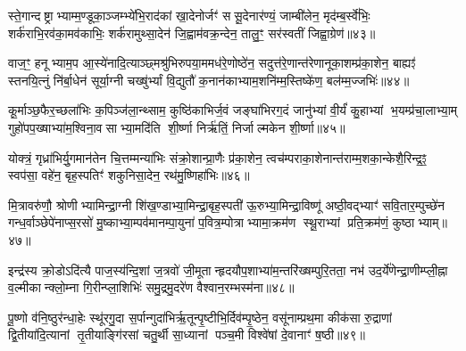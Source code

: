 स्ते॒गान्दष्ट्राभ्याम्म॒ण्डूका॒ञ्जम्भ्ये॑भि॒राद॑कां खा॒देनोर्जꣳ॑ ससू॒देनार॑ण्यं॒ जाम्बी॑लेन॒ मृद॑म्ब॒र्स्वे॑भिः॒ शर्क॑राभि॒रव॑का॒मव॑काभिः॒ शर्क॑रामुथ्सा॒देन॑ जि॒ह्वाम॑वक्र॒न्देन॒ तालु॒ꣳ॒ सर॑स्वतीं जिह्वा॒ग्रेण॑॥४३॥

{\anuvakamend[{स्ते॒गान्द्वाविꣳ॑शतिः॥11॥}]}

वाज॒ꣳ॒ हनूभ्याम॒प आ॒स्ये॑नादि॒त्याञ्छ्मश्रु॑भिरुपया॒ममध॑रे॒णोष्ठे॑न॒ सदुत्त॑रे॒णान्त॑रेणानूका॒शम्प्र॑का॒शेन॒ बाह्यꣵ॑ स्तनयि॒त्नुं नि॑र्बा॒धेन॑ सूर्या॒ग्नी चख्षु॑र्भ्यां वि॒द्युतौ॑ क॒नान॑काभ्याम॒शनि॑म्म॒स्तिष्के॑ण॒ बल॑म्म॒ज्जभिः॑॥४४॥

{\anuvakamend[{वाज॒म्पञ्च॑विशतिः॥12॥}]}

कू॒र्माञ्छ॒फैर॒च्छला॑भिः क॒पिञ्ज॑ला॒न्थ्साम॒ कुष्ठि॑काभिर्ज॒वं जङ्घा॑भिरग॒दं जानु॑भ्यां वी॒र्यं॑ कु॒हाभ्यां भ॒यम्प्र॑चा॒लाभ्या॒म् गुहो॑पप॒ख्षाभ्या॑म॒श्विना॒वसाभ्या॒मदि॑ति शी॒र्ष्णा निर्\mbox{}ऋ॑तिं॒ निर्जाल्मकेन शी॒र्ष्णा॥४५॥

{\anuvakamend[{कू॒र्मान्त्रयो॑विशतिः॥13॥}]}

योक्त्रं॒ गृध्रा॑भिर्यु॒गमान॑तेन चि॒त्तम्मन्या॑भिः संक्रो॒शान्प्रा॒णैः प्र॑का॒शेन॒ त्वच॑म्पराका॒शेनान्त॑राम्म॒शका॒न्केशै॒रिन्द्र॒ꣵ॒ स्वप॑सा॒ वहे॑न॒ बृह॒स्पतिꣳ॑ शकुनिसा॒देन॒ रथ॑मु॒ष्णिहा॑भिः॥४६॥

{\anuvakamend[{योक्त्र॒मेक॑विशतिः॥14॥}]}

मि॒त्रावरु॑णौ॒ श्रोणीभ्यामिन्द्रा॒ग्नी शि॑ख॒ण्डाभ्या॒मिन्द्रा॒बृह॒स्पती॑ ऊ॒रुभ्या॒मिन्द्रा॒विष्णू॑ अष्ठी॒वद्भ्याꣳ॑ सवि॒तार॒म्पुच्छे॑न गन्ध॒र्वाञ्छेपे॑नाप्स॒रसो॑ मु॒ष्काभ्या॒म्पव॑मानम्पा॒युना॑ प॒वित्र॒म्पोत्राभ्यामा॒क्रम॑ण स्थू॒राभ्यां प्रति॒क्रम॑णं॒ कुष्ठाभ्याम्॥४७॥

{\anuvakamend[{॥15॥}]}

इन्द्र॑स्य क्रो॒डोऽदि॑त्यै पाज॒स्य॑न्दि॒शां ज॒त्रवो॑ जी॒मूतान्हृदयौप॒शाभ्या॑म॒न्तरि॑ख्षम्पुरि॒तता॒ नभ॑ उद॒र्ये॑णेन्द्रा॒णीम्प्ली॒ह्ना व॒ल्मीकान्क्लो॒म्ना गि॒रीन्प्ला॒शिभिः॑ समु॒द्रमु॒दरे॑ण वैश्वान॒रम्भस्म॑ना॥४८॥

{\anuvakamend[{मि॒त्रावरु॑णा॒विन्द्र॑स्य॒ द्वाविꣳ॑शति॒र्द्वाविꣳ॑शतिः॥16॥}]}

पू॒ष्णो व॑नि॒ष्ठुर॑न्धा॒हेः स्थू॑रगु॒दा स॒र्पान्गुदा॑भिर्\mbox{}ऋ॒तून्पृ॒ष्टीभि॒र्दिव॑म्पृ॒ष्ठेन॒ वसू॑नाम्प्रथ॒मा कीक॑सा रु॒द्राणां द्वि॒तीया॑दि॒त्यानां तृ॒तीयाङ्गि॑रसां चतु॒र्थी सा॒ध्यानां पञ्च॒मी विश्वे॑षां दे॒वानाꣳ॑ ष॒ष्ठी॥४९॥

{\anuvakamend[{पू॒ष्णश्चतु॑र्विशतिः॥17॥}]}

